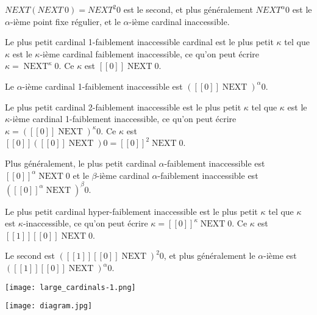 \documentclass[12pt]{beamer}
\begin{document}
\begin{frame}

\( NEXT (NEXT\ 0) = NEXT^2 0 \) est le second, et plus généralement \( NEXT^\alpha 0 \) est le $\alpha$-ième point fixe régulier, et le $\alpha$-ième cardinal inaccessible.

Le plus petit cardinal 1-faiblement inaccessible cardinal est le plus petit \( \kappa \) tel que  \( \kappa \) est le \(\kappa\)-ième cardinal faiblement inaccessible, ce qu'on peut écrire \( \kappa = \operatorname{NEXT}^\kappa 0 \). Ce \( \kappa \) est \( [[0]] \operatorname{NEXT} 0 \).

Le \(\alpha\)-ième cardinal 1-faiblement inaccessible est \( ([[0]] \operatorname{NEXT})^\alpha 0 \).

Le plus petit cardinal 2-faiblement inaccessible est le plus petit \( \kappa \) tel que \( \kappa \) est le \(\kappa\)-ième cardinal 1-faiblement inaccessible, ce qu'on peut écrire \( \kappa = ([[0]] \operatorname{NEXT})^\kappa 0 \). Ce \( \kappa \) est \( [[0]] ([[0]] \operatorname{NEXT}) 0 = [[0]]^2 \operatorname{NEXT} 0 \).

Plus généralement, le plus petit cardinal $\alpha$-faiblement inaccessible est \( [[0]]^{\alpha} \operatorname{NEXT} 0  \) et le \(\beta\)-ième cardinal \(\alpha\)-faiblement inaccessible est \( ([[0]]^{\alpha} \operatorname{NEXT})^\beta 0 \).

\end{frame}
\begin{frame}

Le plus petit cardinal hyper-faiblement inaccessible est le plus petit \( \kappa \) tel que \( \kappa \) est \(\kappa\)-inaccessible, ce qu'on peut écrire \( \kappa = [[0]]^\kappa \operatorname{NEXT} 0 \). Ce \( \kappa \) est \( [[1]] [[0]] \operatorname{NEXT} 0 \).

Le second est \( ([[1]] [[0]] \operatorname{NEXT})^2 0 \), et plus généralement le \(\alpha\)-ième est \( ([[1]] [[0]] \operatorname{NEXT})^\alpha 0 \).

\end{frame}
\begin{frame}

\texttt{[image: large\_cardinals-1.png]}

\end{frame}
\begin{frame}

\texttt{[image: diagram.jpg]}

\end{frame}
\end{document}
